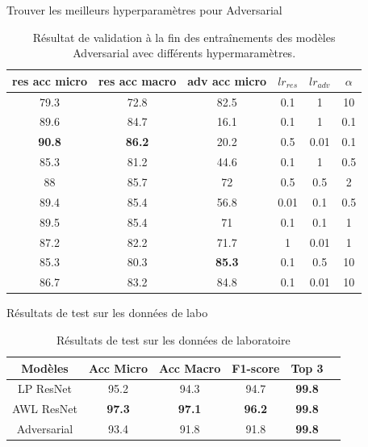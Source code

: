 \documentclass[11pt]{beamer}
\begin{document}
\begin{frame}{Trouver les meilleurs hyperparamètres pour Adversarial}
    \begin{table}[ht]
        \centering
        \begin{tabular}{cccccc}
        \toprule
        res acc micro & res acc macro & adv acc micro & $lr_{res}$ & $lr_{adv}$ & $\alpha$ \\
        \midrule
        79.3 & 72.8 & 82.5 & 0.1 & 1 & 10 \\
        89.6 & 84.7 & 16.1 & 0.1 & 1 & 0.1 \\
        \textbf{90.8} & \textbf{86.2} & 20.2 & 0.5 & 0.01 & 0.1 \\
        85.3 & 81.2 & 44.6 & 0.1 & 1 & 0.5 \\
        88 & 85.7 & 72 & 0.5 & 0.5 & 2 \\
        89.4 & 85.4 & 56.8 & 0.01 & 0.1 & 0.5 \\
        89.5 & 85.4 & 71 & 0.1 & 0.1 & 1 \\
        87.2 & 82.2 & 71.7 & 1 & 0.01 & 1 \\
        85.3 & 80.3 & \textbf{85.3} & 0.1 & 0.5 & 10 \\
        86.7 & 83.2 & 84.8 & 0.1 & 0.01 & 10 \\
        \bottomrule
        \end{tabular}
        \caption{Résultat de validation à la fin des entraînements des modèles Adversarial avec différents hypermaramètres.}
        \label{tab:random search results}
    \end{table}
\end{frame}

\begin{frame}{Résultats de test sur les données de labo}
    \begin{table}[ht]
      \centering
        \begin{tabular}{cccccc}
        \toprule
        Modèles & Acc Micro & Acc Macro & F1-score & Top 3 \\
        \midrule
        LP ResNet & 95.2 & 94.3 & 94.7 & \textbf{99.8} \\
        AWL ResNet & \textbf{97.3} & \textbf{97.1} & \textbf{96.2} & \textbf{99.8} \\
        Adversarial & 93.4 & 91.8 & 91.8 & \textbf{99.8} \\
        \bottomrule
        \end{tabular}
        \caption{Résultats de test sur les données de laboratoire}
        \label{tab:results_lab}
    \end{table}
\end{frame}
\end{document}
